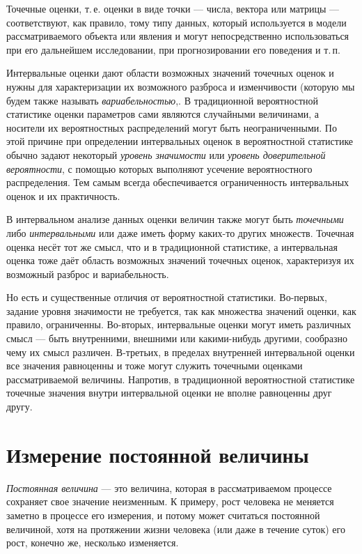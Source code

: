\documentclass[a5paper,openany]{book}
\begin{document}
Точечные оценки, т.\,е. оценки в виде точки --- числа, вектора или матрицы --- 
соответствуют, как правило, тому типу данных, который используется в модели 
рассматриваемого объекта или явления и могут непосредственно использоваться 
при его дальнейшем исследовании, при прогнозировании его поведения и т.\,п. 

Интервальные оценки дают области возможных значений точечных оценок и нужны 
для характеризации их возможного разброса и изменчивости (которую мы будем также 
называть \emph{вариабельностью},. В традиционной вероятностной статистике оценки 
параметров сами являются случайными величинами, а носители их вероятностных 
распределений могут быть неограниченными. По этой причине при определении интервальных 
оценок в вероятностной статистике обычно задают некоторый \emph{уровень значимости} 
или \emph{уровень доверительной вероятности}, с помощью которых выполняют усечение 
вероятностного распределения. Тем самым всегда обеспечивается ограниченность 
интервальных оценок и их практичность. 

В интервальном анализе данных оценки величин также могут быть \emph{точечными} либо 
\emph{интервальными} или даже иметь форму каких-то других множеств. Точечная оценка 
несёт тот же смысл, что и в традиционной статистике, а интервальная оценка тоже даёт 
область возможных значений точечных оценок, характеризуя их возможный разброс и 
вариабельность.

Но есть и существенные отличия от вероятностной статистики. Во-первых, задание уровня 
значимости не требуется, так как множества значений оценки, как правило, ограниченны. 
Во-вторых, интервальные оценки могут иметь различных смысл --- быть внутренними, 
внешними или какими-нибудь другими, сообразно чему их смысл различен. В-третьих, в пределах внутренней интервальной оценки 
все значения равноценны и тоже могут служить точечными оценками рассматриваемой величины. 
Напротив, в традиционной вероятностной статистике точечные значения внутри интервальной 
оценки не вполне равноценны друг другу. 

\section{Измерение постоянной величины} 
\label{MeasrConstChap}

\emph{Постоянная величина} --- это величина, которая в рассматриваемом 
процессе сохраняет свое значение неизменным. К примеру, рост человека не меняется 
заметно в процессе его измерения, и потому может считаться постоянной величиной, 
хотя на протяжении жизни человека (или даже в течение суток) его рост, конечно же, 
несколько изменяется.                              
\end{document}
